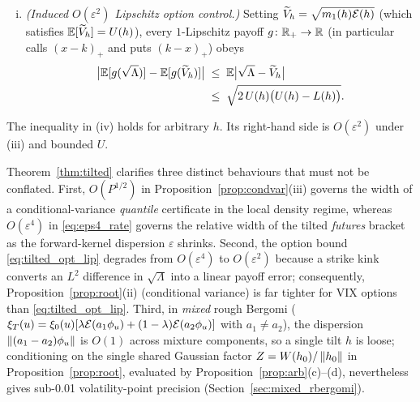 \begin{theorem}
\begin{enumerate}[(i)]
\begin{equation}
\begin{split}
  \end{split}
  \end{equation}
  On the symmetric two-atom control $k_\pm=h\pm\varepsilon e$ ($\norm{e}=1$, $e\perp h$, equal weights),
  $m_2/m_1^2=\cosh(\varepsilon^2)$ and $(U-L)/U=\tfrac14\varepsilon^4+O(\varepsilon^8)$.
\item \emph{(Induced $O(\varepsilon^2)$ Lipschitz option control.)} Setting
  $\widetilde{V}_h=\sqrt{m_1(h)\mathcal{E}(h)}$ (which satisfies $\mathbb{E}[\widetilde{V}_h]=U(h)$), every $1$-Lipschitz
  payoff $g\colon\mathbb{R}_+\to\mathbb{R}$ (in particular calls $(x-k)_+$ and puts $(k-x)_+$) obeys
  \begin{equation}\label{eq:tilted_opt_lip}
  \begin{split}
    \big|\mathbb{E}[g(\sqrt{\Lambda})]-\mathbb{E}[g(\widetilde{V}_h)]\big|
    &\;\le\;\mathbb{E}\big|\sqrt{\Lambda}-\widetilde{V}_h\big|\\
    &\;\le\;\sqrt{2\,U(h)\big(U(h)-L(h)\big)}.
  \end{split}
  \end{equation}
\end{enumerate}
The inequality in (iv) holds for arbitrary $h$. Its right-hand side is $O(\varepsilon^2)$ under (iii) and bounded $U$.
\end{theorem}

\begin{remark}\label{rem:regime_sep}
Theorem~\ref{thm:tilted} clarifies three distinct behaviours that must not be conflated. First,
$O(P^{1/2})$ in Proposition~\ref{prop:condvar}(iii) governs the width of a conditional-variance
\emph{quantile} certificate in the local density regime, whereas $O(\varepsilon^4)$ in \eqref{eq:eps4_rate}
governs the relative width of the tilted \emph{futures} bracket as the forward-kernel dispersion
$\varepsilon$ shrinks. Second, the option bound \eqref{eq:tilted_opt_lip} degrades from $O(\varepsilon^4)$
to $O(\varepsilon^2)$ because a strike kink converts an $L^2$ difference in $\sqrt{\Lambda}$ into a linear
payoff error; consequently, Proposition~\ref{prop:root}(ii) (conditional variance) is far tighter for VIX
options than \eqref{eq:tilted_opt_lip}. Third, in \emph{mixed} rough Bergomi
($\xi_T(u)=\xi_0(u)[\lambda\mathcal{E}(a_1\phi_u)+(1-\lambda)\mathcal{E}(a_2\phi_u)]$ with $a_1\ne a_2$), the dispersion
$\left\lVert (a_1-a_2)\phi_u\right\rVert$ is $O(1)$ across mixture components, so a single tilt $h$ is loose; conditioning
on the single shared Gaussian factor $Z=W(h_0)/\left\lVert h_0\right\rVert$ in Proposition~\ref{prop:root}, evaluated by Proposition~\ref{prop:arb}(c)--(d), nevertheless gives sub-0.01 volatility-point precision
(Section~\ref{sec:mixed_rbergomi}).
\end{remark}

